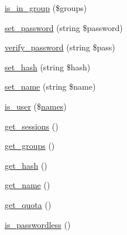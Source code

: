 \begin{DoxyCompactItemize}
\item 
\hyperlink{classlibresignage_1_1common_1_1php_1_1auth_1_1User_a98764627a6fe14a59e969bd7c95995da}{is\+\_\+in\+\_\+group} (\$groups)
\item 
\hyperlink{classlibresignage_1_1common_1_1php_1_1auth_1_1User_ac6e46144a84ca797b3337b825288e0fe}{set\+\_\+password} (string \$password)
\item 
\hyperlink{classlibresignage_1_1common_1_1php_1_1auth_1_1User_ad6dc80c1da90d6b31960a34efb49380c}{verify\+\_\+password} (string \$pass)
\item 
\hyperlink{classlibresignage_1_1common_1_1php_1_1auth_1_1User_a59108ef890101d9f9dd34a93d7a7e520}{set\+\_\+hash} (string \$hash)
\item 
\hyperlink{classlibresignage_1_1common_1_1php_1_1auth_1_1User_a51df58a997c3011452f357f7c98fca36}{set\+\_\+name} (string \$name)
\item 
\hyperlink{classlibresignage_1_1common_1_1php_1_1auth_1_1User_abeb413eb8851221e2ee032ef8954f8c7}{is\+\_\+user} (\$\hyperlink{classlibresignage_1_1common_1_1php_1_1auth_1_1User_ade3e97db7135ba04fa33c4e3aa763d74}{names})
\item 
\hyperlink{classlibresignage_1_1common_1_1php_1_1auth_1_1User_ad5123dcc183a0f7e4761b1b323c6b967}{get\+\_\+sessions} ()
\item 
\hyperlink{classlibresignage_1_1common_1_1php_1_1auth_1_1User_a400eaa5ab78f2adea417ca51e10c7343}{get\+\_\+groups} ()
\item 
\hyperlink{classlibresignage_1_1common_1_1php_1_1auth_1_1User_a44cb3b60aaa0fa11a90b23fb6dd205f9}{get\+\_\+hash} ()
\item 
\hyperlink{classlibresignage_1_1common_1_1php_1_1auth_1_1User_a8a51c5ecce5ad1061696f92879bc2296}{get\+\_\+name} ()
\item 
\hyperlink{classlibresignage_1_1common_1_1php_1_1auth_1_1User_a8fde10a44d1b12833e26ca5b3dcd78b1}{get\+\_\+quota} ()
\item 
\hyperlink{classlibresignage_1_1common_1_1php_1_1auth_1_1User_a3e80c96fd680e00db0180cc99e789c0d}{is\+\_\+passwordless} ()
\end{DoxyCompactItemize}

